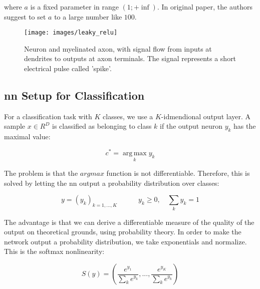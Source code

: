 \noindent where $a$ is a fixed parameter in range $(1; +\inf)$. In original paper, the authors suggest to set $a$ to a large number like $100$.

\begin{figure}[H]
	\centering
	\texttt{[image: images/leaky\_relu]}
	\caption[Leaky Rectified linear activation.]{Neuron and myelinated axon, with signal flow from inputs at dendrites to outputs at axon terminals. The signal represents a short electrical pulse called 'spike'.}
	\label{fig:leakyrelu}
\end{figure}

\subsection{\gls{nn} Setup for Classification}
\label{nn:nnclassification}
For a classification task with $K$ classes, we use a $K$-idmendional output layer. A sample $x \in R^D$ is classified as belonging to class $k$ if the output neuron $y_k$ has the maximal value:

\begin{Equation}[H]
	\centering
	\begin{equation} \label{eq:nnclass}
		c^*= \operatorname*{arg\,max}_k  y_k
	\end{equation}
\end{Equation}

\noindent The problem is that the $arg max$ function is not differentiable. Therefore, this is solved by letting the \gls{nn} output a probability distribution over classes:

\begin{Equation}[H]
	\centering
	\begin{equation} \label{eq:nnclass2}
		y = (y_k)_{k=1,...,K}
		\quad
		\quad
		\quad
		y_k \geq 0,
		\quad
		\sum_{k} y_k = 1
	\end{equation}
\end{Equation}

\noindent The advantage is that we can derive a differentiable measure of the quality of the output on theoretical grounds, using probability theory. In order to make the network output a probability distribution, we take exponentials and normalize. This is the softmax nonlinearity:

\begin{Equation}[H]
	\centering
	\begin{equation} \label{eq:softmax}
		S(y) = (\frac{e^{y_1}}{\sum_k e^{y_k}},...,\frac{e^{y_K}}{\sum_k e^{y_k}})
	\end{equation}
	\caption[Softmax nonlinearity.]{Softmax nonlinearity.}
\end{Equation}

